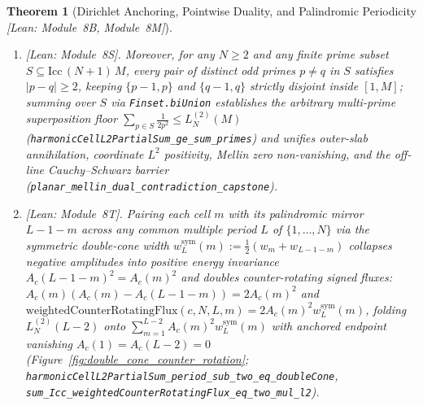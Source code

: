 \documentclass[10pt,a4paper]{article}
\newtheorem{theorem}{Theorem}[section]
\theoremstyle{definition}
\begin{document}
\begin{theorem}[Dirichlet Anchoring, Pointwise Duality, and Palindromic Periodicity \emph{[Lean: Module~8B, Module~8M]}]
\begin{enumerate}[leftmargin=1.8em,itemsep=2pt]
\item \emph{[Lean: Module~8S].} Moreover, for any $N \ge 2$ and any finite prime subset $S \subseteq \mathrm{Icc}\,(N+1)\,M$, every pair of distinct odd primes $p \neq q$ in $S$ satisfies $|p - q| \ge 2$, keeping $\{p-1, p\}$ and $\{q-1, q\}$ strictly disjoint inside $[1, M]$; summing over $S$ via \texttt{Finset.biUnion} establishes the arbitrary multi-prime superposition floor $\sum_{p \in S} \frac{1}{2p^2} \le L_N^{(2)}(M)$ (\texttt{harmonicCellL2PartialSum\_\allowbreak ge\_\allowbreak sum\_\allowbreak primes}) and unifies outer-slab annihilation, coordinate $L^2$ positivity, Mellin zero non-vanishing, and the off-line Cauchy--Schwarz barrier (\texttt{planar\_\allowbreak mellin\_\allowbreak dual\_\allowbreak contradiction\_\allowbreak capstone}).
\item \emph{[Lean: Module~8T].} Pairing each cell $m$ with its palindromic mirror $L - 1 - m$ across any common multiple period $L$ of $\{1, \dots, N\}$ via the symmetric double-cone width $w_L^{\mathrm{sym}}(m) := \frac{1}{2}(w_m + w_{L-1-m})$ collapses negative amplitudes into positive energy invariance $A_c(L - 1 - m)^2 = A_c(m)^2$ and doubles counter-rotating signed fluxes: $A_c(m)(A_c(m) - A_c(L - 1 - m)) = 2 A_c(m)^2$ and $\mathrm{weightedCounterRotatingFlux}(c,N,L,m) = 2 A_c(m)^2 w_L^{\mathrm{sym}}(m)$, folding $L_N^{(2)}(L - 2)$ onto $\sum_{m=1}^{L-2} A_c(m)^2 w_L^{\mathrm{sym}}(m)$ with anchored endpoint vanishing $A_c(1) = A_c(L - 2) = 0$ (Figure~\ref{fig:double_cone_counter_rotation}; \texttt{harmonicCellL2PartialSum\_\allowbreak period\_\allowbreak sub\_\allowbreak two\_\allowbreak eq\_\allowbreak doubleCone}, \texttt{sum\_\allowbreak Icc\_\allowbreak weightedCounterRotatingFlux\_\allowbreak eq\_\allowbreak two\_\allowbreak mul\_\allowbreak l2}).

\end{enumerate}
\end{theorem}
\end{document}
